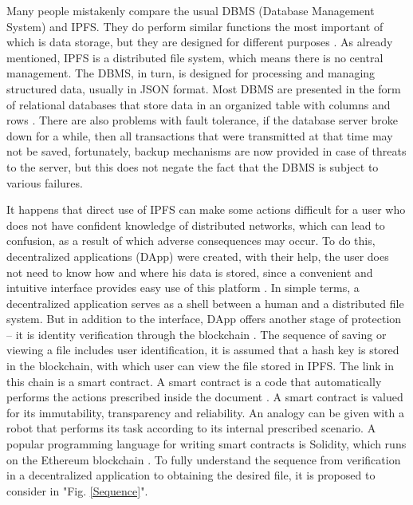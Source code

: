 \documentclass[10pt,conference,a4paper]{IEEEtran_EDM}
\begin{document}
Many people mistakenly compare the usual DBMS (Database Management System) and IPFS.
They do perform similar functions the most important of which is data storage, but they are designed for different purposes \cite{Ruan}.
As already mentioned, IPFS is a distributed file system, which means there is no central management.
The DBMS, in turn, is designed for processing and managing structured data, usually in JSON format.
Most DBMS are presented in the form of relational databases that store data in an organized table with columns and rows \cite{Gillenson}.
There are also problems with fault tolerance, if the database server broke down for a while, then all transactions that were transmitted at that time may not be saved, fortunately, backup mechanisms are now provided in case of threats to the server, but this does not negate the fact that the DBMS is subject to various failures.

It happens that direct use of IPFS can make some actions difficult for a user who does not have confident knowledge of distributed networks, which can lead to confusion, as a result of which adverse consequences may occur.
To do this, decentralized applications (DApp) were created, with their help, the user does not need to know how and where his data is stored, since a convenient and intuitive interface provides easy use of this platform \cite{Infante}.
In simple terms, a decentralized application serves as a shell between a human and a distributed file system.
But in addition to the interface, DApp offers another stage of protection – it is identity verification through the blockchain \cite{Lin}.
The sequence of saving or viewing a file includes user identification, it is assumed that a hash key is stored in the blockchain, with which user can view the file stored in IPFS.
The link in this chain is a smart contract.
A smart contract is a code that automatically performs the actions prescribed inside the document \cite{Frolov}.
A smart contract is valued for its immutability, transparency and reliability.
An analogy can be given with a robot that performs its task according to its internal prescribed scenario.
A popular programming language for writing smart contracts is Solidity, which runs on the Ethereum blockchain \cite{Khan Nabeel}.
To fully understand the sequence from verification in a decentralized application to obtaining the desired file, it is proposed to consider in "Fig. \ref{Sequence}".
\end{document}
